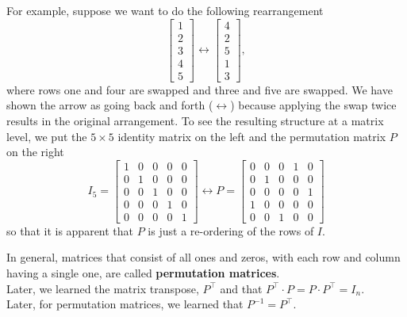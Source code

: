 \documentclass[letterpaper]{book}
\begin{document}
For example, suppose we want to do the following rearrangement
\begin{equation}
\label{eq:Permuation}
     \left[\begin{array}{r} 1 \\2 \\3 \\ 4 \\ 5\end{array} \right] \leftrightarrow \left[\begin{array}{r} 4 \\2 \\5 \\ 1 \\ 3\end{array} \right],
\end{equation}
where rows one and four are swapped and three and five are swapped. We have shown the arrow as going back and forth ($\leftrightarrow$) because applying the swap twice results in the original arrangement. To see the resulting structure at a matrix level, we put the $5 \times 5$ identity matrix on the left and the permutation matrix $P$ on the right
$$
I_5=\begin{bmatrix}
1&0&0&0&0\\
0&1&0&0&0\\
0&0&1&0&0\\
0&0&0&1&0\\
0&0&0&0&1
\end{bmatrix} \leftrightarrow
P=\begin{bmatrix}
0&0&0&1&0\\
0&1&0&0&0\\
0&0&0&0&1\\
1&0&0&0&0\\
0&0&1&0&0
\end{bmatrix}
$$
so that it is apparent that $P$ is just a re-ordering of the rows of $I$.


\begin{tcolorbox}[title=\textbf{Permutation Matrices, the Full Story}]
In general, matrices that consist of all ones and zeros, with each row and column having a single one, are called \textbf{permutation matrices}. \\

Later, we learned the matrix transpose, $P^\top$ and that $ P^\top \cdot P= P \cdot P^\top = I_n$.\\

Later, for permutation matrices,  we learned that $P^{-1} = P^\top$. 
\end{tcolorbox}
\end{document}
